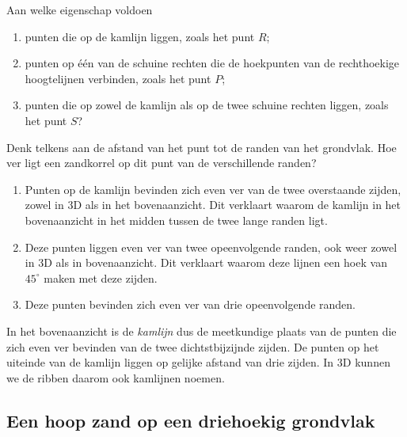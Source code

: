 \documentclass{ximera}
\begin{document}
\begin{exercise}
    Aan welke eigenschap voldoen
    \begin{enumerate}[label=(\alph*)]
        \item punten die op de kamlijn liggen, zoals het punt \(R\);
        \item punten op \'e\'en van de schuine rechten die de hoekpunten van de
            rechthoekige hoogtelijnen verbinden, zoals het punt \(P\);
        \item punten die op zowel de kamlijn als op de twee schuine rechten liggen, zoals
            het punt \(S\)?
    \end{enumerate}
    \begin{hint}
        Denk telkens aan de afstand van het punt tot de randen van het grondvlak. Hoe ver
        ligt een zandkorrel op dit punt van de verschillende randen?
    \end{hint}
    \begin{oplossing}
        \begin{enumerate}[label=(\alph*)]
            \item Punten op de kamlijn bevinden zich even ver van de twee overstaande
                zijden, zowel in 3D als in het bovenaanzicht. Dit verklaart waarom de
                kamlijn in het bovenaanzicht in het midden tussen de twee lange randen ligt.
            \item Deze punten liggen even ver van twee opeenvolgende randen, ook weer zowel
                in 3D als in bovenaanzicht. Dit verklaart waarom deze lijnen een hoek van
                \(45^\circ\) maken met deze zijden.
            \item Deze punten bevinden zich even ver van drie opeenvolgende randen.
        \end{enumerate}
    \end{oplossing}
\end{exercise}


In het bovenaanzicht is de \textit{kamlijn} dus de meetkundige plaats van de punten die
zich even ver bevinden van de twee dichtstbijzijnde zijden. De punten op het uiteinde van
de kamlijn liggen op gelijke afstand van drie zijden. In 3D kunnen we de ribben daarom ook
kamlijnen noemen.


\subsection*{Een hoop zand op een driehoekig grondvlak}
\end{document}
